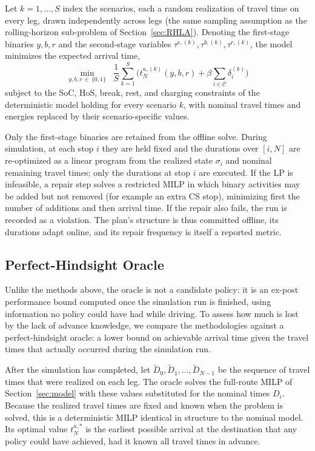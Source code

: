 \documentclass[preprint,12pt,3p]{elsarticle}
\begin{document}
Let $k = 1, \ldots, S$ index the scenarios, each a random realization of travel time on every leg, drawn independently across legs (the same sampling assumption as the rolling-horizon sub-problem of Section~\ref{sec:RHLA}). Denoting the first-stage binaries $y, b, r$ and the second-stage variables $\tau^{c,(k)}, \tau^{b,(k)}, \tau^{r,(k)}$, the model minimizes the expected arrival time,
\[
  \min_{y,b,r \,\in\, \{0,1\}} \;\; \frac{1}{S}\sum_{k=1}^{S} \bigl(t^{a,(k)}_N(y,b,r) + \beta \sum_{i \in \mathcal C}\delta_i^{(k)}\bigr)
\]
subject to the SoC, HoS, break, rest, and charging constraints of the deterministic model holding for every scenario $k$, with nominal travel times and energies replaced by their scenario-specific values.

Only the first-stage binaries are retained from the offline solve. During simulation, at each stop $i$ they are held fixed and the durations over $[i, N]$ are re-optimized as a linear program from the realized state $\sigma_i$ and nominal remaining travel times; only the durations at stop $i$ are executed. If the LP is infeasible, a repair step solves a restricted MILP in which binary activities may be added but not removed (for example an extra CS stop), minimizing first the number of additions and then arrival time. If the repair also fails, the run is recorded as a violation. The plan's structure is thus committed offline, its durations adapt online, and its repair frequency is itself a reported metric.



\subsection{Perfect-Hindsight Oracle} \label{sec:oracle}
Unlike the methods above, the oracle is not a candidate policy: it is an ex-post performance bound computed once the simulation run is finished, using information no policy could have had while driving.
To assess how much is lost by the lack of advance knowledge, we compare the methodologies against a perfect-hindsight oracle: a lower bound on achievable arrival time given the travel times that actually occurred during the simulation run.

After the simulation has completed, let $\tilde{D}_0, \tilde{D}_1, \ldots, \tilde{D}_{N-1}$ be the sequence of travel times that were realized on each leg. The oracle solves the full-route MILP of Section~\ref{sec:model} with these values substituted for the nominal times $D_i$. Because the realized travel times are fixed and known when the problem is solved, this is a deterministic MILP identical in structure to the nominal model. Its optimal value $t^{a,*}_N$ is the earliest possible arrival at the destination that any policy could have achieved, had it known all travel times in advance.
\end{document}
